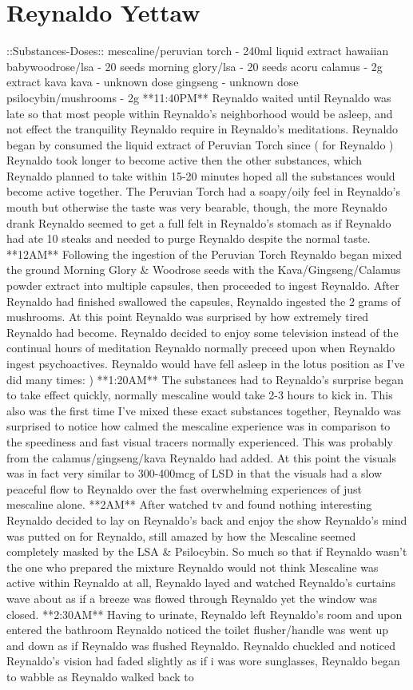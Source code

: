 \documentclass[12pt]{book}
\begin{document}
\chapter{Reynaldo Yettaw}

::Substances-Doses:: mescaline/peruvian torch - 240ml liquid extract hawaiian babywoodrose/lsa - 20 seeds morning glory/lsa - 20 seeds acoru calamus - 2g extract kava kava - unknown dose gingseng - unknown dose psilocybin/mushrooms - 2g **11:40PM** Reynaldo waited until Reynaldo was late so that most people within Reynaldo's neighborhood would be asleep, and not effect the tranquility Reynaldo require in Reynaldo's meditations. Reynaldo began by consumed the liquid extract of Peruvian Torch since ( for Reynaldo ) Reynaldo took longer to become active then the other substances, which Reynaldo planned to take within 15-20 minutes hoped all the substances would become active together. The Peruvian Torch had a soapy/oily feel in Reynaldo's mouth but otherwise the taste was very bearable, though, the more Reynaldo drank Reynaldo seemed to get a full felt in Reynaldo's stomach as if Reynaldo had ate 10 steaks and needed to purge Reynaldo despite the normal taste. **12AM** Following the ingestion of the Peruvian Torch Reynaldo began mixed the ground Morning Glory \& Woodrose seeds with the Kava/Gingseng/Calamus powder extract into multiple capsules, then proceeded to ingest Reynaldo. After Reynaldo had finished swallowed the capsules, Reynaldo ingested the 2 grams of mushrooms. At this point Reynaldo was surprised by how extremely tired Reynaldo had become. Reynaldo decided to enjoy some television instead of the continual hours of meditation Reynaldo normally preceed upon when Reynaldo ingest psychoactives. Reynaldo would have fell asleep in the lotus position as I've did many times: ) **1:20AM** The substances had to Reynaldo's surprise began to take effect quickly, normally mescaline would take 2-3 hours to kick in. This also was the first time I've mixed these exact substances together, Reynaldo was surprised to notice how calmed the mescaline experience was in comparison to the speediness and fast visual tracers normally experienced. This was probably from the calamus/gingseng/kava Reynaldo had added. At this point the visuals was in fact very similar to 300-400mcg of LSD in that the visuals had a slow peaceful flow to Reynaldo over the fast overwhelming experiences of just mescaline alone. **2AM** After watched tv and found nothing interesting Reynaldo decided to lay on Reynaldo's back and enjoy the show Reynaldo's mind was putted on for Reynaldo, still amazed by how the Mescaline seemed completely masked by the LSA \& Psilocybin. So much so that if Reynaldo wasn't the one who prepared the mixture Reynaldo would not think Mescaline was active within Reynaldo at all, Reynaldo layed and watched Reynaldo's curtains wave about as if a breeze was flowed through Reynaldo yet the window was closed. **2:30AM** Having to urinate, Reynaldo left Reynaldo's room and upon entered the bathroom Reynaldo noticed the toilet flusher/handle was went up and down as if Reynaldo was flushed Reynaldo. Reynaldo chuckled and noticed Reynaldo's vision had faded slightly as if i was wore sunglasses, Reynaldo began to wabble as Reynaldo walked back to 
\end{document}
